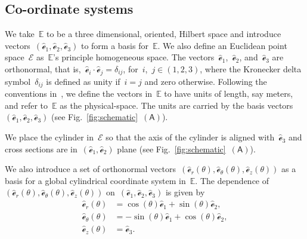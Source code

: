 \documentclass[preprint,10pt,times]{elsarticle}
\numberwithin{equation}{section}
\newcommand{\physe}{\hat{\mathscr{e}}} %
\newcommand{\pr}[1]{\left( #1 \right)}
\newcommand{\subf}[1]{\pr{\textsf{#1}}}
\renewcommand{\>}{$\Rightarrow$}
\begin{document}
\subsection{Co-ordinate systems}
We take~$\mathbb{E}$ to be a three dimensional, oriented, Hilbert space and introduce vectors~$(\physe_1,\physe_2,\physe_3)$ to form a basis for~$\mathbb{E}$. We also define an Euclidean point space~$\mathcal{E}$ as~$\mathbb{E}$'s principle homogeneous space.
The vectors~$\physe_1$,~$\physe_2$, and~$\physe_3$ are orthonormal, that is,~$\physe_i\cdot\physe_j=\delta_{ij}$, for~$i$,~$j\in (1,2,3)$, where the Kronecker delta symbol~$\delta_{ij}$ is defined as unity if~$i=j$ and zero otherwise.
Following the conventions in~\cite{rahaman2020accelerometer,deng2021angle}, we define the vectors in~$\mathbb{E}$ to have units of length, say meters, and refer to~$\mathbb{E}$ as the physical-space. The units are carried by the basis vectors~$(\physe_1,\physe_2,\physe_3)$ (see Fig.~\ref{fig:schematic}~$\subf{A}$).

We place the cylinder in~$\mathcal{E}$ so that the axis of the cylinder is aligned with~$\physe_3$ and cross sections are in~$(\physe_1,\physe_2)$ plane (see Fig.~\ref{fig:schematic}~$\subf{A}$).

We also introduce a set of orthonormal vectors~$(\physe_{r}(\theta),\physe_{\theta}(\theta),\physe_{z}(\theta))$ as a basis for a global cylindrical coordinate system in~$\mathbb{E}$. The dependence of~$(\physe_{r}(\theta),\physe_{\theta}(\theta),\physe_{z}(\theta))$ on~$(\physe_1,\physe_2,\physe_3)$ is given by
\begin{subequations}
\begin{align}
\physe_{r}(\theta) & = \cos(\theta) \physe_1 + \sin(\theta) \physe_2 , \\
\physe_{\theta}(\theta) & = -\sin(\theta) \physe_1 + \cos(\theta) \physe_2 , \\
\physe_{z} (\theta) & =  \physe_3.
\end{align}
\end{subequations}
\end{document}
